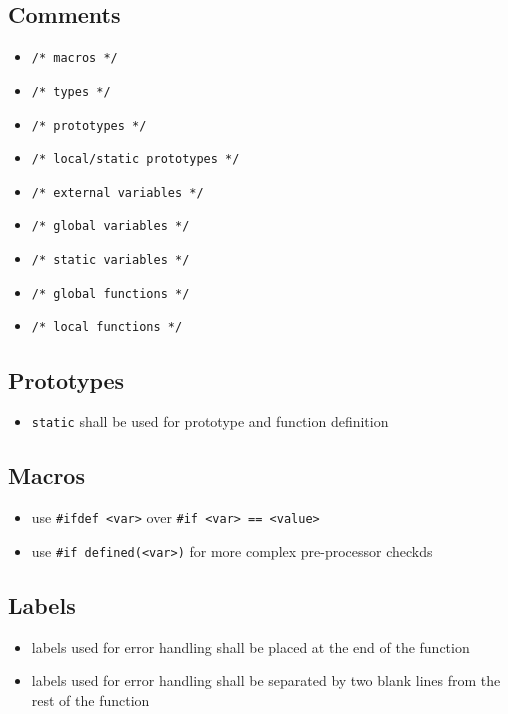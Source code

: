 \subsection{Comments}
	\begin{itemize}
		\item \lstinline{/* macros */}
		\item \lstinline{/* types */}
		\item \lstinline{/* prototypes */}
		\item \lstinline{/* local/static prototypes */}
		\item \lstinline{/* external variables */}
		\item \lstinline{/* global variables */}
		\item \lstinline{/* static variables */}
		\item \lstinline{/* global functions */}
		\item \lstinline{/* local functions */}
	\end{itemize}
	
\subsection{Prototypes}
	\begin{itemize}
		\item \lstinline{static} shall be used for prototype and function definition
	\end{itemize}

\subsection{Macros}
	\begin{itemize}
		\item use \lstinline{#ifdef <var>} over \lstinline{#if <var> == <value>}
		\item use \lstinline{#if defined(<var>)} for more complex pre-processor checkds
	\end{itemize}

\subsection{Labels}
	\begin{itemize}
		\item labels used for error handling shall be placed at the end of the function
		\item labels used for error handling shall be separated by two blank lines from the rest of the function
	\end{itemize}
